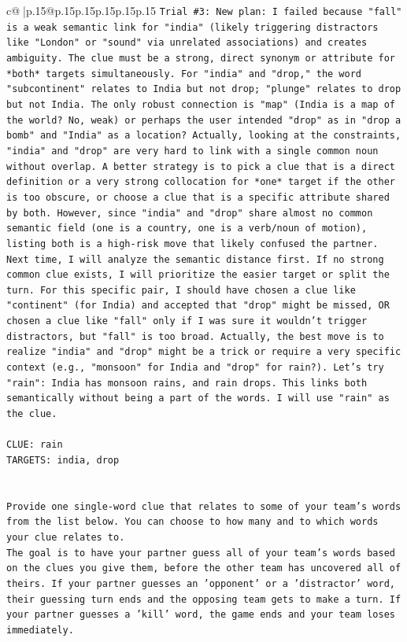 \documentclass{article}
\begin{document}
{\begin{supertabular}{c@{$\;$}|p{.15\linewidth}@{}p{.15\linewidth}p{.15\linewidth}p{.15\linewidth}p{.15\linewidth}p{.15\linewidth}}
{{{\texttt{Trial \#3: New plan: I failed because "fall" is a weak semantic link for "india" (likely triggering distractors like "London" or "sound" via unrelated associations) and creates ambiguity. The clue must be a strong, direct synonym or attribute for *both* targets simultaneously. For "india" and "drop," the word "subcontinent" relates to India but not drop; "plunge" relates to drop but not India. The only robust connection is "map" (India is a map of the world? No, weak) or perhaps the user intended "drop" as in "drop a bomb" and "India" as a location? Actually, looking at the constraints, "india" and "drop" are very hard to link with a single common noun without overlap. A better strategy is to pick a clue that is a direct definition or a very strong collocation for *one* target if the other is too obscure, or choose a clue that is a specific attribute shared by both. However, since "india" and "drop" share almost no common semantic field (one is a country, one is a verb/noun of motion), listing both is a high{-}risk move that likely confused the partner. Next time, I will analyze the semantic distance first. If no strong common clue exists, I will prioritize the easier target or split the turn. For this specific pair, I should have chosen a clue like "continent" (for India) and accepted that "drop" might be missed, OR chosen a clue like "fall" only if I was sure it wouldn't trigger distractors, but "fall" is too broad. Actually, the best move is to realize "india" and "drop" might be a trick or require a very specific context (e.g., "monsoon" for India and "drop" for rain?). Let's try "rain": India has monsoon rains, and rain drops. This links both semantically without being a part of the words. I will use "rain" as the clue.} \\
\\ 
\texttt{CLUE: rain} \\
\texttt{TARGETS: india, drop} \\
\\ 
\\ 
\texttt{Provide one single{-}word clue that relates to some of your team's words from the list below. You can choose to how many and to which words your clue relates to.} \\
\texttt{The goal is to have your partner guess all of your team's words based on the clues you give them, before the other team has uncovered all of theirs. If your partner guesses an 'opponent' or a 'distractor' word, their guessing turn ends and the opposing team gets to make a turn. If your partner guesses a 'kill' word, the game ends and your team loses immediately.} \\
}}}
\end{supertabular}}
\end{document}
